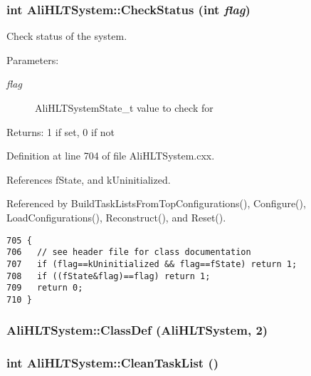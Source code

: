 \subsubsection{\setlength{\rightskip}{0pt plus 5cm}int Ali\-HLTSystem::Check\-Status (int {\em flag})}\label{classAliHLTSystem_a28}


Check status of the system. \begin{Desc}
\item[Parameters:]
\begin{description}
\item[{\em flag}]Ali\-HLTSystem\-State\_\-t value to check for \end{description}
\end{Desc}
\begin{Desc}
\item[Returns:]1 if set, 0 if not \end{Desc}


Definition at line 704 of file Ali\-HLTSystem.cxx.

References f\-State, and k\-Uninitialized.

Referenced by Build\-Task\-Lists\-From\-Top\-Configurations(), Configure(), Load\-Configurations(), Reconstruct(), and Reset().

\footnotesize\begin{verbatim}705 {
706   // see header file for class documentation
707   if (flag==kUninitialized && flag==fState) return 1;
708   if ((fState&flag)==flag) return 1;
709   return 0;
710 }
\end{verbatim}\normalsize 


\subsubsection{\setlength{\rightskip}{0pt plus 5cm}Ali\-HLTSystem::Class\-Def ({\bf Ali\-HLTSystem}, 2)\hspace{0.3cm}{\tt  [private]}}\label{classAliHLTSystem_d2}


\subsubsection{\setlength{\rightskip}{0pt plus 5cm}int Ali\-HLTSystem::Clean\-Task\-List ()}\label{classAliHLTSystem_a9}


